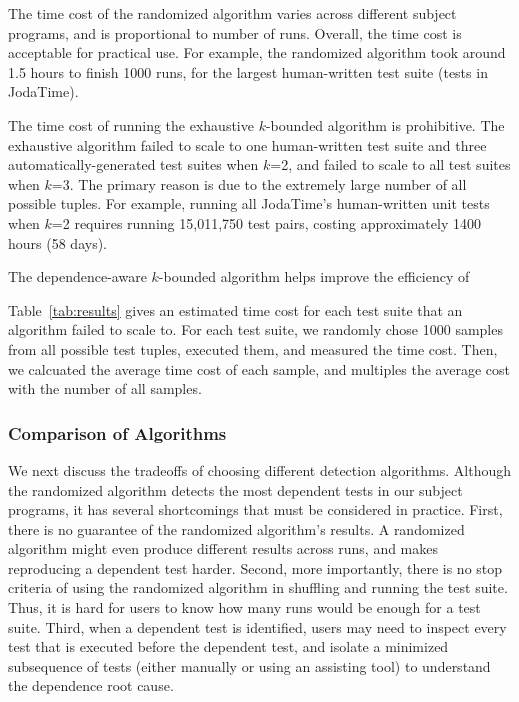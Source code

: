 The time cost of the randomized algorithm 
varies across different subject programs, and
is proportional to number of runs. Overall, the
time cost is acceptable for practical use.
For example, the randomized algorithm took around 1.5 hours
to finish 1000 runs,  for the largest human-written test
suite (\jodatimetests tests in JodaTime).
 
The time cost of running the exhaustive $k$-bounded algorithm
is prohibitive. The exhaustive algorithm failed to
scale to one human-written test suite and three automatically-generated
test suites when $k$=2, and failed to scale to all test suites
when $k$=3. The primary reason is due to the extremely large
number of all possible tuples. For example, running all JodaTime's \jodatimetests human-written
unit tests when $k$=2 requires running 15,011,750 test pairs, costing
approximately 1400 hours (58 days). 

The dependence-aware $k$-bounded algorithm helps improve
the efficiency of 

Table~\ref{tab:results} gives an estimated time cost for each
test suite that an algorithm failed to scale to. For each test suite,
we randomly chose 1000 samples from all possible
test tuples, executed them, and measured the time cost. Then,
we calcuated the average time cost of each sample, and multiples
the average cost with the number of all samples.



\subsubsection{Comparison of Algorithms}
\label{sec:algcomparison}

We next discuss the tradeoffs of choosing different detection
algorithms. Although the randomized algorithm
detects the most dependent tests in our subject programs,
it has several shortcomings that must be considered
in practice. First, there is no guarantee of
the randomized algorithm's results. A randomized
algorithm might even produce different results across runs,
and makes reproducing a dependent test harder.
Second, more importantly, there is no stop criteria
of using the randomized algorithm in shuffling and
running the test suite. Thus, it is hard for users
to know how many runs would be enough for a test suite.
Third, when a dependent test is identified, users
may need to inspect every test that is executed
before the dependent test, and isolate  a minimized
subsequence of tests (either
manually or using an assisting tool) to understand the dependence root cause.

